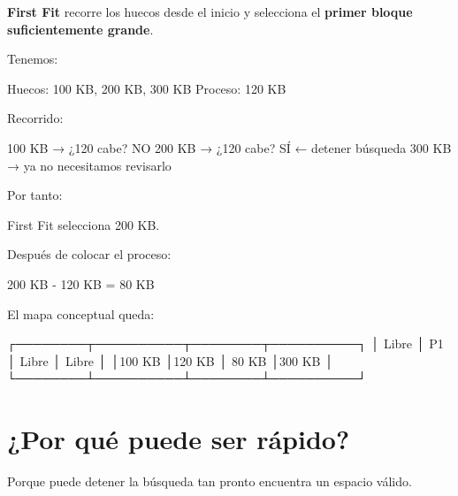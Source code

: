 \documentclass[
  spanish,
  letterpaper,
]{scrbook}
\newenvironment{Shaded}{\begin{snugshade}}{\end{snugshade}}
\newcommand{\NormalTok}[1]{\textcolor[rgb]{0.00,0.23,0.31}{#1}}
\begin{document}
\textbf{First Fit} recorre los huecos desde el inicio y selecciona el
\textbf{primer bloque suficientemente grande}.

Tenemos:

\begin{Shaded}
\begin{Highlighting}[]
\NormalTok{Huecos: 100 KB, 200 KB, 300 KB}
\NormalTok{Proceso: 120 KB}
\end{Highlighting}
\end{Shaded}

Recorrido:

\begin{Shaded}
\begin{Highlighting}[]
\NormalTok{100 KB → ¿120 cabe? NO}
\NormalTok{200 KB → ¿120 cabe? SÍ  ← detener búsqueda}
\NormalTok{300 KB → ya no necesitamos revisarlo}
\end{Highlighting}
\end{Shaded}

Por tanto:

\begin{Shaded}
\begin{Highlighting}[]
\NormalTok{First Fit selecciona 200 KB.}
\end{Highlighting}
\end{Shaded}

Después de colocar el proceso:

\begin{Shaded}
\begin{Highlighting}[]
\NormalTok{200 KB {-} 120 KB = 80 KB}
\end{Highlighting}
\end{Shaded}

El mapa conceptual queda:

\begin{Shaded}
\begin{Highlighting}[]
\NormalTok{┌────────┬──────────┬────────┬──────────┐}
\NormalTok{│ Libre  │ P1       │ Libre  │ Libre    │}
\NormalTok{│100 KB  │120 KB    │ 80 KB  │300 KB   │}
\NormalTok{└────────┴──────────┴────────┴──────────┘}
\end{Highlighting}
\end{Shaded}

\section{¿Por qué puede ser
rápido?}\label{por-quuxe9-puede-ser-ruxe1pido}

Porque puede detener la búsqueda tan pronto encuentra un espacio válido.
\end{document}
